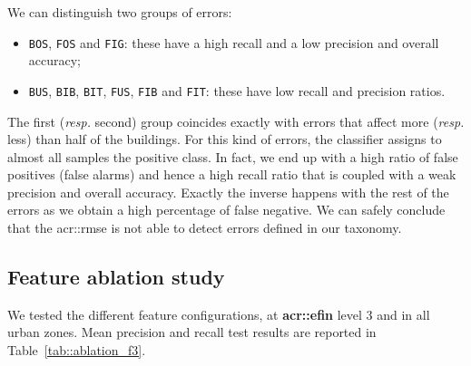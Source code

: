        We can distinguish two groups of errors: 
        \begin{itemize}[label=\(\blacktriangleright\)]
            \item \texttt{BOS}, \texttt{FOS} and \texttt{FIG}: these have a high recall and a low precision and overall accuracy;
            \item \texttt{BUS}, \texttt{BIB}, \texttt{BIT}, \texttt{FUS}, \texttt{FIB} and \texttt{FIT}: these have low recall and precision ratios.
        \end{itemize}
        The first (\textit{resp.} second) group coincides exactly with errors that affect more (\textit{resp.} less) than half of the buildings.
        For this kind of errors, the classifier assigns to almost all samples the positive class.
        In fact, we end up with a high ratio of false positives (false alarms) and hence a high recall ratio that is coupled with a weak precision and overall accuracy.
        Exactly the inverse happens with the rest of the errors as we obtain a high percentage of false negative.
        We can safely conclude that the \gls{acr::rmse} is not able to detect errors defined in our taxonomy.

    \subsection{Feature ablation study}
        \label{subsec::experiments::baseline_feature_analysis::ablation}
        We tested the different feature configurations, at \textbf{\gls{acr::efin}} level 3 and in all urban zones.
        Mean precision and recall test results are reported in Table~\ref{tab::ablation_f3}.

